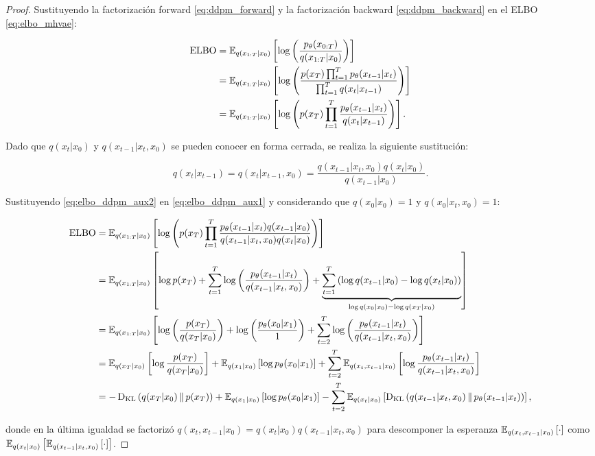 \begin{proof}
    Sustituyendo la factorización forward \eqref{eq:ddpm_forward} y la factorización backward \eqref{eq:ddpm_backward} en el ELBO \eqref{eq:elbo_mhvae}:

    \begin{align}
        \operatorname{ELBO} & = \mathbb{E}_{q(x_{1:T}|x_0)}\left[\log\left(\frac{p_\theta(x_{0:T})}{q(x_{1:T}|x_0)}\right)\right]\nonumber                                           \\
              & = \mathbb{E}_{q(x_{1:T}|x_0)}\left[\log\left(\frac{p(x_T)\prod_{t=1}^{T} p_\theta(x_{t-1}|x_t)}{\prod_{t=1}^{T} q(x_t|x_{t-1})}\right)\right]\nonumber \\
              & = \mathbb{E}_{q(x_{1:T}|x_0)}\left[\log\left(p(x_T)\prod_{t=1}^{T}\frac{p_\theta(x_{t-1}|x_t)}{q(x_t|x_{t-1})}\right)\right]\label{eq:elbo_ddpm_aux1}.
    \end{align}

    Dado que $q(x_t|x_0)$ y $q(x_{t-1}|x_t,x_0)$ se pueden conocer en forma cerrada, se realiza la siguiente sustitución:

    \begin{equation}
        \label{eq:elbo_ddpm_aux2}
        q(x_t|x_{t-1}) = q(x_t|x_{t-1},x_0) = \frac{q(x_{t-1}|x_t,x_0)q(x_t|x_0)}{q(x_{t-1}|x_0)}.
    \end{equation}

    Sustituyendo \eqref{eq:elbo_ddpm_aux2} en \eqref{eq:elbo_ddpm_aux1} y considerando que $q(x_0|x_0)=1$ y $q(x_0|x_t,x_0)=1$:

    \begin{align*}
        \operatorname{ELBO} & = \mathbb{E}_{q(x_{1:T}|x_0)}\left[\log\left(p(x_T)\prod_{t=1}^{T}\frac{p_\theta(x_{t-1}|x_t)q(x_{t-1}|x_0)}{q(x_{t-1}|x_t,x_0)q(x_t|x_0)}\right)\right]                                                                                          \\
              & = \mathbb{E}_{q(x_{1:T}|x_0)}\left[\log p(x_T) + \sum_{t=1}^T \log\left(\frac{p_\theta(x_{t-1}|x_t)}{q(x_{t-1}|x_t,x_0)}\right) + \underbrace{\sum_{t=1}^T \left(\log q(x_{t-1}|x_0)-\log q(x_t|x_0)\right)}_{\log q(x_0|x_0)-\log q(x_T|x_0)}\right] \\
              & = \mathbb{E}_{q(x_{1:T}|x_0)}\left[\log\left(\frac{p(x_T)}{q(x_T|x_0)}\right) + \log\left(\frac{p_\theta(x_0|x_1)}{1}\right) + \sum_{t=2}^T \log\left(\frac{p_\theta(x_{t-1}|x_t)}{q(x_{t-1}|x_t,x_0)}\right)\right]                                      \\
              & = \mathbb{E}_{q(x_T|x_0)}\left[\log \frac{p(x_T)}{q(x_T|x_0)}\right] + \mathbb{E}_{q(x_1|x_0)}\left[\log p_\theta(x_0|x_1)\right] + \sum_{t=2}^T \mathbb{E}_{q(x_t,x_{t-1}|x_0)}\left[\log\frac{p_\theta(x_{t-1}|x_t)}{q(x_{t-1}|x_t,x_0)}\right]                                     \\
              & = -\operatorname{D_{KL}}\left(q(x_T|x_0)\,\|\,p(x_T)\right) + \mathbb{E}_{q(x_1|x_0)}\left[\log p_\theta(x_0|x_1)\right] - \sum_{t=2}^T \mathbb{E}_{q(x_t|x_0)}\left[\operatorname{D_{KL}}\left(q(x_{t-1}|x_t,x_0)\,\|\,p_\theta(x_{t-1}|x_t)\right)\right],
    \end{align*}

    donde en la última igualdad se factorizó $q(x_t,x_{t-1}|x_0)=q(x_t|x_0)q(x_{t-1}|x_t,x_0)$ para descomponer la esperanza $\mathbb{E}_{q(x_t,x_{t-1}|x_0)}\left[\cdot\right]$ como $\mathbb{E}_{q(x_t|x_0)}\left[\mathbb{E}_{q(x_{t-1}|x_t,x_0)}\left[\cdot\right]\right]$.
\end{proof}

